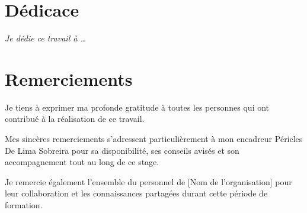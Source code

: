 \documentclass[12pt, a4paper, oneside]{report}
\begin{document}
\chapter*{Dédicace}
\vspace{3cm}
\begin{center}
  \itshape
  Je dédie ce travail à \ldots
\end{center}
\clearpage

\chapter*{Remerciements}
Je tiens à exprimer ma profonde gratitude à toutes les personnes qui ont
contribué à la réalisation de ce travail.

Mes sincères remerciements s'adressent particulièrement à mon encadreur
Péricles De Lima Sobreira pour sa disponibilité, ses conseils avisés et son
accompagnement tout au long de ce stage.

Je remercie également l'ensemble du personnel de [Nom de l'organisation]
pour leur collaboration et les connaissances partagées durant cette période
de formation.
\clearpage

\tableofcontents
\clearpage

\listoffigures
\clearpage

\listoftables
\clearpage

\end{document}
